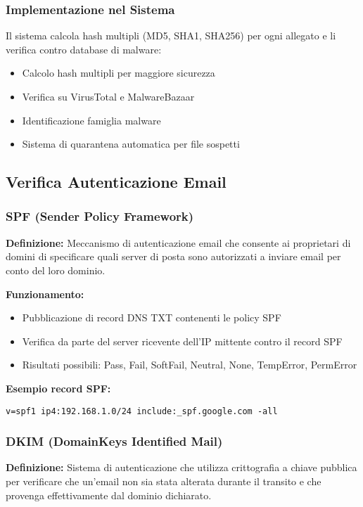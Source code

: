 \documentclass{article}
\begin{document}
\subsubsection{Implementazione nel Sistema}

Il sistema calcola hash multipli (MD5, SHA1, SHA256) per ogni allegato e li verifica contro database di malware:

\begin{itemize}
    \item Calcolo hash multipli per maggiore sicurezza
    \item Verifica su VirusTotal e MalwareBazaar
    \item Identificazione famiglia malware
    \item Sistema di quarantena automatica per file sospetti
\end{itemize}

\subsection{Verifica Autenticazione Email}

\subsubsection{SPF (Sender Policy Framework)}
\textbf{Definizione:} Meccanismo di autenticazione email che consente ai proprietari di domini di specificare quali server di posta sono autorizzati a inviare email per conto del loro dominio.

\textbf{Funzionamento:}
\begin{itemize}
    \item Pubblicazione di record DNS TXT contenenti le policy SPF
    \item Verifica da parte del server ricevente dell'IP mittente contro il record SPF
    \item Risultati possibili: Pass, Fail, SoftFail, Neutral, None, TempError, PermError
\end{itemize}

\textbf{Esempio record SPF:}
\begin{lstlisting}[caption=Esempio record SPF]
v=spf1 ip4:192.168.1.0/24 include:_spf.google.com -all
\end{lstlisting}

\subsubsection{DKIM (DomainKeys Identified Mail)}
\textbf{Definizione:} Sistema di autenticazione che utilizza crittografia a chiave pubblica per verificare che un'email non sia stata alterata durante il transito e che provenga effettivamente dal dominio dichiarato.
\end{document}
